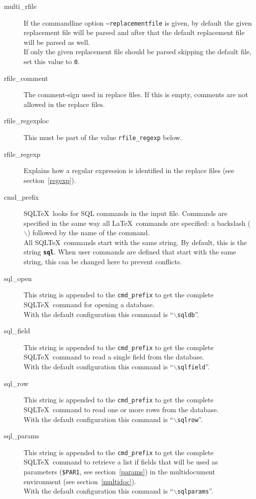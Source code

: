 \documentclass{article}
\newcommand{\bs}{\ensuremath{\backslash}}
\begin{document}
\begin{description}
\item[multi\_rfile]If the commandline option \texttt{--replacementfile} is given, by default the given replacement file will be parsed and after that the default replacement file will be parsed as well.\\
If only the given replacement file should be parsed skipping the default file, set this value to \texttt{0}.

\item[rfile\_comment] The comment-sign used in replace files. If this is empty, comments are not allowed in
the replace files.

\item[rfile\_regexploc] This must be part of the value \texttt{rfile\_regexp} below. 

\item[rfile\_regexp] Explains how a regular expression is identified in the replace files (see section~\ref{regexp}). 

\item[cmd\_prefix]\label{prefix} SQL\TeX\ looks for SQL commands in the input file. Commands are specified in the
same way all \LaTeX\ commands are specified: a backslash (\bs) followed by the
name of the command.\\
All SQL\TeX\ commands start with the same string. By default, this is the string
\texttt{\textbf{sql}}. When user commands are defined that start with the same
string, this can be changed here to prevent conflicts.

\item[sql\_open] This string is appended to the \texttt{cmd\_prefix} to
get the complete SQL\TeX\ command for opening a database.\\
With the default configuration this command is ``\texttt{\bs sqldb}''.

\item[sql\_field] This string is appended to the \texttt{cmd\_prefix} to
get the complete SQL\TeX\ command to read a single field from the database.\\
With the default configuration this command is ``\texttt{\bs sqlfield}''.

\item[sql\_row] This string is appended to the \texttt{cmd\_prefix} to
get the complete SQL\TeX\ command to read one or more rows from the database.\\
With the default configuration this command is ``\texttt{\bs sqlrow}''.

\item[sql\_params] This string is appended to the \texttt{cmd\_prefix} to get the complete SQL\TeX\ command to retrieve a list if fields that will be used as parameters (\texttt{\$PAR1}, see section~\ref{params}) in the multidocument environment (see section~\ref{multidoc}).\\
With the default configuration this command is ``\texttt{\bs sqlparams}''.


\end{description}
\end{document}
